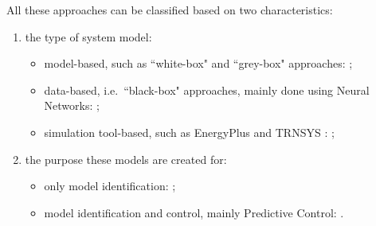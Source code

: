 \textcolor[rgb]{0,0,1}{
All these approaches can be classified based on two characteristics:
\begin{enumerate}
	\item the type of system model:
		\begin{itemize}
			\item model-based, such as ``white-box" and ``grey-box" approaches: \cite{Shakouri2017SCS,Li2014EB,Yoon2014EB,Li2016AE,Harb2016EB,Salakij2016EB,Li2016E,Li2016EB,Hou2013,Cecconi2017EB};
			\item data-based, i.e.~``black-box" approaches, mainly done using Neural Networks: \cite{Safa2017SCS,Neto2008EB,Magnier2010BE,Candanedo2017EB,Ascione2017E,Cecconi2017EB,Li2016AE};
			\item simulation tool-based, such as EnergyPlus \cite{energyPlus} and TRNSYS \cite{trnsys2000}: \cite{Yin2016EB,Christantoni2016EB};
		\end{itemize}
	\item the purpose these models are created for:
		\begin{itemize}
			\item only model identification: \cite{Safa2017SCS,Neto2008EB,Magnier2010BE,Li2014EB,Li2016AE,Harb2016EB,Li2016EB,Candanedo2017EB,Cecconi2017EB,Ascione2017E};
			\item model identification and control, mainly Predictive Control: \cite{Shakouri2017SCS,Yoon2014EB,Yin2016EB,Salakij2016EB,Li2016E,Hu2017AE}.
		\end{itemize}
\end{enumerate}
}

